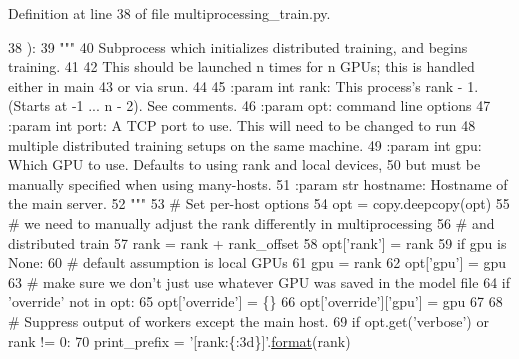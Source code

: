 Definition at line 38 of file multiprocessing\+\_\+train.\+py.


\begin{DoxyCode}
38 ):
39     \textcolor{stringliteral}{"""}
40 \textcolor{stringliteral}{    Subprocess which initializes distributed training, and begins training.}
41 \textcolor{stringliteral}{}
42 \textcolor{stringliteral}{    This should be launched n times for n GPUs; this is handled either in main}
43 \textcolor{stringliteral}{    or via srun.}
44 \textcolor{stringliteral}{}
45 \textcolor{stringliteral}{    :param int rank: This process's rank - 1. (Starts at -1 ... n - 2). See comments.}
46 \textcolor{stringliteral}{    :param opt: command line options}
47 \textcolor{stringliteral}{    :param int port: A TCP port to use. This will need to be changed to run}
48 \textcolor{stringliteral}{        multiple distributed training setups on the same machine.}
49 \textcolor{stringliteral}{    :param int gpu: Which GPU to use. Defaults to using rank and local devices,}
50 \textcolor{stringliteral}{        but must be manually specified when using many-hosts.}
51 \textcolor{stringliteral}{    :param str hostname: Hostname of the main server.}
52 \textcolor{stringliteral}{    """}
53     \textcolor{comment}{# Set per-host options}
54     opt = copy.deepcopy(opt)
55     \textcolor{comment}{# we need to manually adjust the rank differently in multiprocessing}
56     \textcolor{comment}{# and distributed train}
57     rank = rank + rank\_offset
58     opt[\textcolor{stringliteral}{'rank'}] = rank
59     \textcolor{keywordflow}{if} gpu \textcolor{keywordflow}{is} \textcolor{keywordtype}{None}:
60         \textcolor{comment}{# default assumption is local GPUs}
61         gpu = rank %
62     opt[\textcolor{stringliteral}{'gpu'}] = gpu
63     \textcolor{comment}{# make sure we don't just use whatever GPU was saved in the model file}
64     \textcolor{keywordflow}{if} \textcolor{stringliteral}{'override'} \textcolor{keywordflow}{not} \textcolor{keywordflow}{in} opt:
65         opt[\textcolor{stringliteral}{'override'}] = \{\}
66     opt[\textcolor{stringliteral}{'override'}][\textcolor{stringliteral}{'gpu'}] = gpu
67 
68     \textcolor{comment}{# Suppress output of workers except the main host.}
69     \textcolor{keywordflow}{if} opt.get(\textcolor{stringliteral}{'verbose'}) \textcolor{keywordflow}{or} rank != 0:
70         print\_prefix = \textcolor{stringliteral}{'[rank:\{:3d\}]'}.\hyperlink{namespaceparlai_1_1chat__service_1_1services_1_1messenger_1_1shared__utils_a32e2e2022b824fbaf80c747160b52a76}{format}(rank)

\end{DoxyCode}
